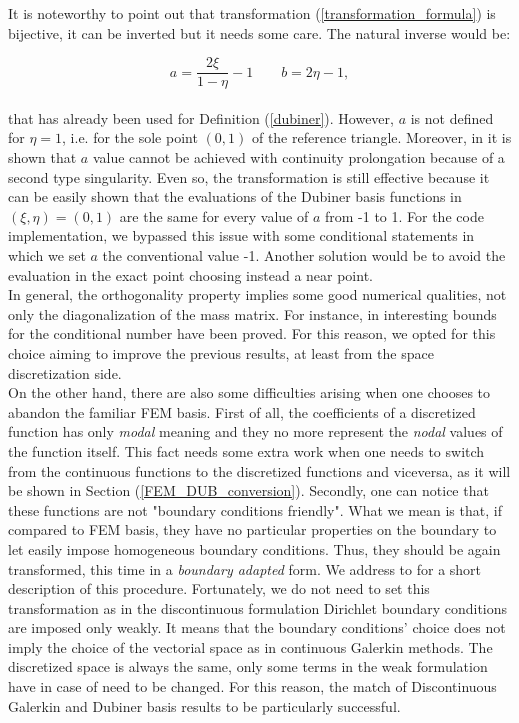 \documentclass[a4paper,11pt]{article}
\begin{document}
    \noindent It is noteworthy to point out that transformation (\ref{transformation_formula}) is bijective, it can be inverted but it needs some care. The natural inverse would be:
    
    \begin{equation*}
    a = \frac{2\xi}{1-\eta}-1 \quad \quad b = 2\eta-1,
    \end{equation*}
    \vspace{2mm} \\
    \noindent that has already been used for Definition (\ref{dubiner}). However, $a$ is not defined for $\eta=1$, i.e. for the sole point $(0,1)$ of the reference triangle. Moreover, in \cite{sherwin} it is shown that $a$ value cannot be achieved with continuity prolongation because of a second type singularity. Even so, the transformation is still effective because it can be easily shown that the evaluations of the Dubiner basis functions in $(\xi,\eta)=(0,1)$ are the same for every value of $a$ from -1 to 1. For the code implementation, we bypassed this issue with some conditional statements in which we set $a$ the conventional value -1. Another solution would be to avoid the evaluation in the exact point choosing instead a near point.\\
    
    \noindent In general, the orthogonality property implies some good numerical qualities, not only the diagonalization of the mass matrix. For instance, in \cite{antonietti} interesting bounds for the conditional number have been proved. For this reason, we opted for this choice aiming to improve the previous results, at least from the space discretization side. \\
    
    \noindent On the other hand, there are also some difficulties arising when one chooses to abandon the familiar FEM basis. First of all, the coefficients of a discretized function has only \emph{modal} meaning and they no more represent the \emph{nodal} values of the function itself. This fact needs some extra work when one needs to switch from the continuous functions to the discretized functions and viceversa, as it will be shown in Section (\ref{FEM_DUB_conversion}). Secondly, one can notice that these functions are not "boundary conditions friendly". What we mean is that, if compared to FEM basis, they have no particular properties on the boundary to let easily impose homogeneous boundary conditions. Thus, they should be again transformed, this time in a \emph{boundary adapted} form. We address to \cite{napde} for a short description of this procedure. Fortunately, we do not need to set this transformation as in the discontinuous formulation Dirichlet boundary conditions are imposed only weakly. It means that the boundary conditions' choice does not imply the choice of the vectorial space as in continuous Galerkin methods. The discretized space is always the same, only some terms in the weak formulation have in case of need to be changed. For this reason, the match of Discontinuous Galerkin and Dubiner basis results to be particularly successful. \\
    
\end{document}
